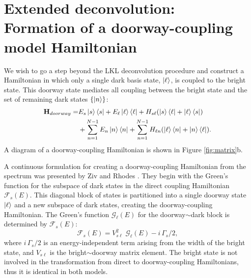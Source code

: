 
\section{Extended deconvolution: \\
  Formation of a doorway-coupling model Hamiltonian}

We wish to go a step beyond the LKL deconvolution procedure and
construct a Hamiltonian in which only a single dark basis state,
$\mathinner{|{\ell}\rangle}$, is coupled to the bright state.  This doorway state
mediates all coupling between the bright state and the set of
remaining dark states $\lbrace \mathinner{|{n}\rangle} \rbrace$:
\begin{equation}
  \begin{split}
    \mathbf{H}_{doorway} =&
    E_s\mathinner{|{s}\rangle}\mathinner{\langle{s}|}
    + E_{\ell}\mathinner{|{\ell}\rangle}\mathinner{\langle{\ell}|}
    + H_{s\ell} ( \mathinner{|{s}\rangle}\mathinner{\langle{\ell}|} + \mathinner{|{\ell}\rangle}\mathinner{\langle{s}|} ) \\
    & + \sum_{n=1}^{N-1} E_n\mathinner{|{n}\rangle}\mathinner{\langle{n}|}
    + \sum_{n=1}^{N-1} H_{\ell n} (\mathinner{|{\ell}\rangle}\mathinner{\langle{n}|} + \mathinner{|{n}\rangle}\mathinner{\langle{\ell}|}).
  \end{split}
\end{equation}
A diagram of a doorway-coupling Hamiltonian is shown in Figure
\ref{fig:matrix}b.

A continuous formulation for creating a doorway-coupling Hamiltonian
from the spectrum was presented by Ziv and Rhodes \cite{ziv76}.  They
begin with the Green's function for the subspace of dark states in the
direct coupling Hamiltonian $\mathcal{F}_s(E)$.  This diagonal block
of states is partitioned into a single doorway state $\mathinner{|{\ell}\rangle}$ and
a new subspace of dark states, creating the doorway-coupling
Hamiltonian.  The Green's function $\mathcal{G}_{\ell}(E)$ for the
doorway$\sim$dark block is determined by $\mathcal{F}_s(E)$:
\begin{equation}
  \label{eq:green-doorway}
  \mathcal{F}_s(E) = V_{s\ell}^2 \; \mathcal{G}_{\ell}(E) - i \, \Gamma_s / 2,
\end{equation}
where $i \, \Gamma_s / 2$ is an energy-independent term arising from
the width of the bright state, and $V_{s\ell}$ is the
bright$\sim$doorway matrix element.  The bright state is not
involved in the transformation from direct to doorway-coupling
Hamiltonians, thus it is identical in both models. 

